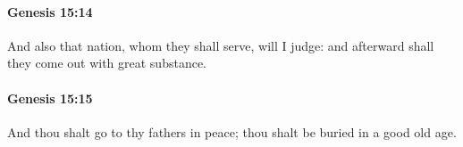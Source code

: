 		\paragraph{Genesis 15:14} %
			\label{GENESIS-15-14}

			And also that nation, whom they shall serve, will I judge: and afterward shall they come out with great substance.


		\paragraph{Genesis 15:15} %
			\label{GENESIS-15-15}

			And thou shalt go to thy fathers in peace; thou shalt be buried in a good old age.


